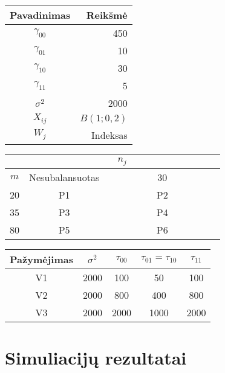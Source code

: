 \documentclass[12pt,a4paper]{article}
\begin{document}
\begin{table}[!htb]
\begin{small}

\begin{tabular}{|c|r|}
\hline
Pavadinimas & Reikšmė\\
\hline
$\gamma_{00}$& 450  \\
$\gamma_{01}$& 10  \\
$\gamma_{10}$& 30 \\
$\gamma_{11}$& 5  \\
$\sigma^2$& 2000  \\
$X_{ij}$ &  $B\left(1; 0,2\right)$ \\
$W_{j}$ &  Indeksas \\
\hline
\end{tabular}

\begin{tabular}{|c|cc|}
\hline
 & \multicolumn{2}{c|}{$n_j$}\\
\hline
$m$& Nesubalansuotas & \ \ \ \ \ \ \ \ \ \ 30\ \ \ \ \ \ \ \ \ \ \\
\hline
20& P1&P2\\
35&P3&P4\\
80& P5&P6\\
\hline
\end{tabular}

\begin{tabular}{|c|cccc|}
\hline
 Pažymėjimas & $\sigma^2$&$\tau_{00}$&$\tau_{01}=\tau_{10}$&$\tau_{11}$\\
\hline
V1&2000&100&50&100\\
V2&2000&800&400&800\\
V3&2000&2000&1000&2000\\
\hline

\hline
\end{tabular}
\end{small}
\end{table}

\section{Simuliacijų rezultatai}
\end{document}
